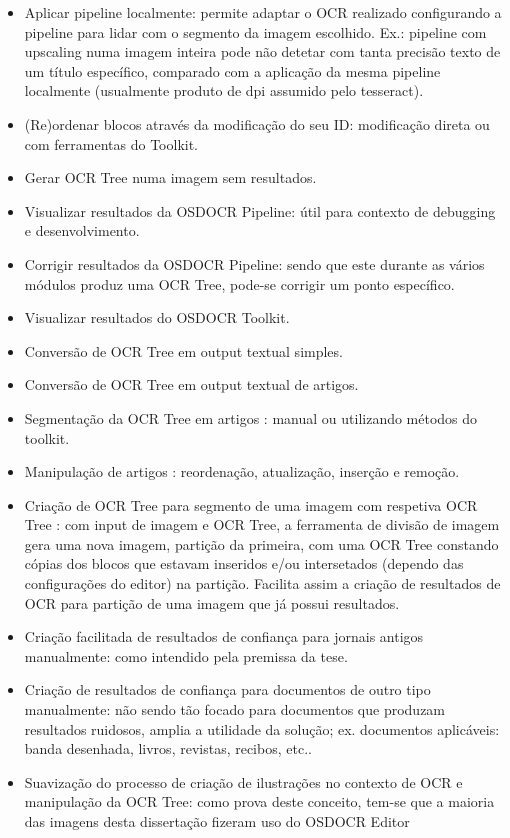 \begin{itemize}
	\item Aplicar pipeline localmente: permite adaptar o OCR realizado configurando a pipeline para lidar com o segmento da imagem escolhido. Ex.: pipeline com upscaling numa imagem inteira pode não detetar com tanta precisão texto de um título específico, comparado com a aplicação da mesma pipeline localmente (usualmente produto de dpi assumido pelo tesseract).
	
	\item (Re)ordenar blocos através da modificação do seu ID: modificação direta ou com ferramentas do Toolkit.
	
	
	\item Gerar OCR Tree numa imagem sem resultados.
	\item Visualizar resultados da OSDOCR Pipeline: útil para contexto de debugging e desenvolvimento.
	
	\item Corrigir resultados da OSDOCR Pipeline: sendo que este durante as vários módulos produz uma OCR Tree, pode-se corrigir um ponto específico.
	\item Visualizar resultados do OSDOCR Toolkit.
	
	\item Conversão de  OCR Tree em output textual simples.
	
	\item Conversão de OCR Tree em output textual de artigos.
	
	\item Segmentação da OCR Tree em artigos : manual ou utilizando métodos do toolkit.
	
	\item Manipulação de artigos : reordenação, atualização, inserção e remoção.
	
	\item Criação de OCR Tree para segmento de uma imagem com respetiva OCR Tree : com input de imagem e OCR Tree, a ferramenta de divisão de imagem gera uma nova imagem, partição da primeira, com uma OCR Tree constando cópias dos blocos que estavam inseridos e/ou intersetados (dependo das configurações do editor) na partição. Facilita assim a criação de resultados de OCR para partição de uma imagem que já possui resultados.
	
	\item Criação facilitada de resultados de confiança para jornais antigos manualmente: como intendido pela premissa da tese.
	
	\item Criação de resultados de confiança para documentos de outro tipo manualmente: não sendo tão focado para documentos que produzam resultados ruidosos, amplia a utilidade da solução; ex. documentos aplicáveis: banda desenhada, livros, revistas, recibos, etc..
	
	\item Suavização do processo de criação de ilustrações no contexto de OCR e manipulação da OCR Tree: como prova deste conceito, tem-se que a maioria das imagens desta dissertação fizeram uso do OSDOCR Editor
\end{itemize}

